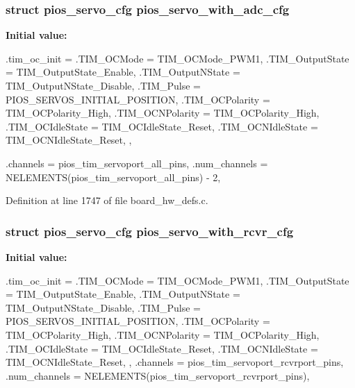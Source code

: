 \hypertarget{group___quanton_ga7364dfea1ec6777467be23eca90eddc4}{
\subsubsection[{pios\-\_\-servo\-\_\-with\-\_\-adc\-\_\-cfg}]{\setlength{\rightskip}{0pt plus 5cm}struct {\bf pios\-\_\-servo\-\_\-cfg} {\bf pios\-\_\-servo\-\_\-with\-\_\-adc\-\_\-cfg}}}\label{group___quanton_ga7364dfea1ec6777467be23eca90eddc4}
{\bfseries \-Initial value\-:}
\begin{DoxyCode}
 {
        .tim_oc_init = {
                .TIM_OCMode = TIM_OCMode_PWM1,
                .TIM_OutputState = TIM_OutputState_Enable,
                .TIM_OutputNState = TIM_OutputNState_Disable,
                .TIM_Pulse = PIOS_SERVOS_INITIAL_POSITION,
                .TIM_OCPolarity = TIM_OCPolarity_High,
                .TIM_OCNPolarity = TIM_OCPolarity_High,
                .TIM_OCIdleState = TIM_OCIdleState_Reset,
                .TIM_OCNIdleState = TIM_OCNIdleState_Reset,
        },
        
        .channels = pios_tim_servoport_all_pins,
        .num_channels = NELEMENTS(pios_tim_servoport_all_pins) - 2,
}
\end{DoxyCode}


\-Definition at line 1747 of file board\-\_\-hw\-\_\-defs.\-c.

\hypertarget{group___quanton_gacc33e67397fe094afb637cb843497083}{
\subsubsection[{pios\-\_\-servo\-\_\-with\-\_\-rcvr\-\_\-cfg}]{\setlength{\rightskip}{0pt plus 5cm}struct {\bf pios\-\_\-servo\-\_\-cfg} {\bf pios\-\_\-servo\-\_\-with\-\_\-rcvr\-\_\-cfg}}}\label{group___quanton_gacc33e67397fe094afb637cb843497083}
{\bfseries \-Initial value\-:}
\begin{DoxyCode}
 {
        .tim_oc_init = {
                .TIM_OCMode = TIM_OCMode_PWM1,
                .TIM_OutputState = TIM_OutputState_Enable,
                .TIM_OutputNState = TIM_OutputNState_Disable,
                .TIM_Pulse = PIOS_SERVOS_INITIAL_POSITION,
                .TIM_OCPolarity = TIM_OCPolarity_High,
                .TIM_OCNPolarity = TIM_OCPolarity_High,
                .TIM_OCIdleState = TIM_OCIdleState_Reset,
                .TIM_OCNIdleState = TIM_OCNIdleState_Reset,
        },
        .channels = pios_tim_servoport_rcvrport_pins,
        .num_channels = NELEMENTS(pios_tim_servoport_rcvrport_pins),
}
\end{DoxyCode}


